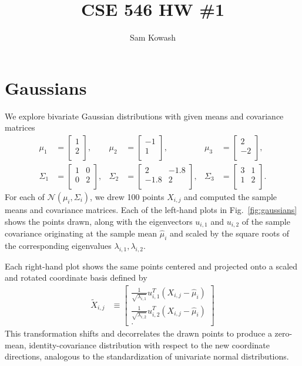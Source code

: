 \documentclass[11pt,letterpaper]{article}
\author{Sam Kowash}
\title{CSE 546 HW \#1}
\numberwithin{equation}{section}
\numberwithin{figure}{section}
\begin{document}
\maketitle
\section{Gaussians}
We explore bivariate Gaussian distributions with given means and covariance matrices
%
\begin{align*}
	\mu_1 &= \begin{bmatrix}1\\2\\\end{bmatrix},
	&
	\mu_2 &= \begin{bmatrix}-1\\1\\\end{bmatrix},
	& 
	\mu_3 &= \begin{bmatrix}2\\-2\\\end{bmatrix},\\
	\Sigma_1 &= \begin{bmatrix}
			1 & 0\\
			0 & 2\\
		\end{bmatrix},
	&
	\Sigma_2 &= \begin{bmatrix}
			2 & -1.8\\
			-1.8 & 2\\
		\end{bmatrix},
	&
	\Sigma_3 &= \begin{bmatrix}
			3 & 1\\
			1 & 2\\
		\end{bmatrix}.
\end{align*}
%
For each of $\mathcal{N}(\mu_i,\Sigma_i)$, we drew 100 points $X_{i,j}$ and computed the sample means and covariance matrices. Each of the left-hand plots in Fig.~\ref{fig:gaussians} shows the points drawn, along with the eigenvectors $u_{i,1}$ and $u_{i,2}$ of the sample covariance originating at the sample mean $\hat{\mu}_i$ and scaled by the square roots of the corresponding eigenvalues $\lambda_{i,1}, \lambda_{i,2}$.

Each right-hand plot shows the same points centered and projected onto a scaled and rotated coordinate basis defined by
%
\begin{align*}
	\tilde{X}_{i,j} &\equiv \begin{bmatrix}
			\frac{1}{\sqrt{\lambda_{i,1}}} u_{i,1}^T (X_{i,j}-\hat{\mu}_i)\\
			\frac{1}{\sqrt{\lambda_{i,2}}} u_{i,2}^T (X_{i,j}-\hat{\mu}_i)\\.
		\end{bmatrix}
\end{align*}
%
This transformation shifts and decorrelates the drawn points to produce a zero-mean, identity-covariance distribution with respect to the new coordinate directions, analogous to the standardization of univariate normal distributions.
\end{document}
